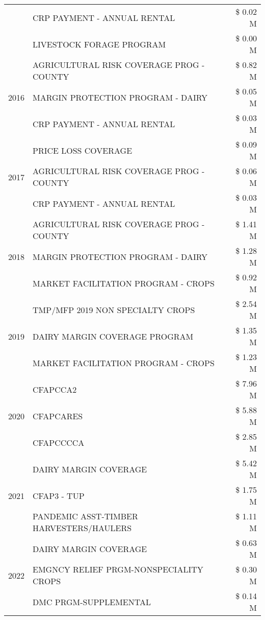 \begin{tabular}{llr}
 & CRP PAYMENT - ANNUAL RENTAL & \$ 0.02 M \\
 & LIVESTOCK FORAGE PROGRAM & \$ 0.00 M \\
\cline{1-3}
\multirow[t]{3}{*}{2016} & AGRICULTURAL RISK COVERAGE PROG - COUNTY & \$ 0.82 M \\
 & MARGIN PROTECTION PROGRAM - DAIRY & \$ 0.05 M \\
 & CRP PAYMENT - ANNUAL RENTAL & \$ 0.03 M \\
\cline{1-3}
\multirow[t]{3}{*}{2017} & PRICE LOSS COVERAGE & \$ 0.09 M \\
 & AGRICULTURAL RISK COVERAGE PROG - COUNTY & \$ 0.06 M \\
 & CRP PAYMENT - ANNUAL RENTAL & \$ 0.03 M \\
\cline{1-3}
\multirow[t]{3}{*}{2018} & AGRICULTURAL RISK COVERAGE PROG - COUNTY & \$ 1.41 M \\
 & MARGIN PROTECTION PROGRAM - DAIRY & \$ 1.28 M \\
 & MARKET FACILITATION PROGRAM - CROPS & \$ 0.92 M \\
\cline{1-3}
\multirow[t]{3}{*}{2019} & TMP/MFP 2019 NON SPECIALTY CROPS & \$ 2.54 M \\
 & DAIRY MARGIN COVERAGE PROGRAM & \$ 1.35 M \\
 & MARKET FACILITATION PROGRAM - CROPS & \$ 1.23 M \\
\cline{1-3}
\multirow[t]{3}{*}{2020} & CFAPCCA2 & \$ 7.96 M \\
 & CFAPCARES & \$ 5.88 M \\
 & CFAPCCCCA & \$ 2.85 M \\
\cline{1-3}
\multirow[t]{3}{*}{2021} & DAIRY MARGIN COVERAGE & \$ 5.42 M \\
 & CFAP3 - TUP & \$ 1.75 M \\
 & PANDEMIC ASST-TIMBER HARVESTERS/HAULERS & \$ 1.11 M \\
\cline{1-3}
\multirow[t]{3}{*}{2022} & DAIRY MARGIN COVERAGE & \$ 0.63 M \\
 & EMGNCY RELIEF PRGM-NONSPECIALITY CROPS & \$ 0.30 M \\
 & DMC PRGM-SUPPLEMENTAL & \$ 0.14 M \\
\cline{1-3}
\bottomrule
\end{tabular}
